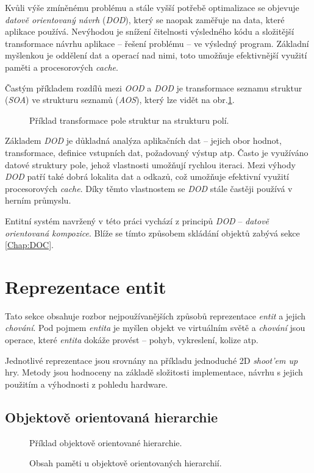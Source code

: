Kvůli výše zmíněnému problému a stále vyšší potřebě optimalizace se objevuje \emph{datově orientovaný návrh}\cite{DOD} (\emph{DOD}), který se naopak zaměřuje na data, které aplikace používá. Nevýhodou je snížení čitelnosti výsledného kódu a složitější transformace návrhu aplikace -- řešení problému -- ve výsledný program. Základní myšlenkou je oddělení dat a operací nad nimi, toto umožňuje efektivnější využití paměti a procesorových \emph{cache}. 

Častým příkladem rozdílů mezi \emph{OOD} a \emph{DOD} je transformace seznamu struktur (\emph{SOA}) ve strukturu seznamů (\emph{AOS}), který lze vidět na obr.\ref{Fig:SOAASO}.

\begin{figure}[]
	\caption{Příklad transformace pole struktur na strukturu polí. }
	\label{Fig:SOAASO}
\end{figure}

Základem \emph{DOD} je důkladná analýza aplikačních dat -- jejich obor hodnot, transformace, definice vstupních dat, požadovaný výstup atp. Často je využíváno datové struktury pole, jehož vlastnosti umožňují rychlou iteraci. Mezi výhody \emph{DOD} patří také dobrá lokalita dat a odkazů, což umožňuje efektivní využití procesorových \emph{cache}. Díky těmto vlastnostem se \emph{DOD} stále častěji používá v herním průmyslu\cite{DataOrientedDesignDice}\cite{DataOrientedDesignCppCon}.

Entitní systém navržený v této práci vychází z principů \emph{DOD} -- \emph{datově orientovaná kompozice}\cite{DODComponents}. Blíže se tímto způsobem skládání objektů zabývá sekce \ref{Chap:DOC}.

\section{Reprezentace entit}

Tato sekce obsahuje rozbor nejpoužívanějších způsobů reprezentace \emph{entit}\cite{EvolveHierarchy} a jejich \emph{chování}. Pod pojmem \emph{entita} je myšlen objekt ve virtuálním světě a \emph{chování} jsou operace, které \emph{entita} dokáže provést -- pohyb, vykreslení, kolize atp.

Jednotlivé reprezentace jsou srovnány na příkladu jednoduché 2D \emph{shoot'em up} hry. Metody jsou hodnoceny na základě složitosti implementace, návrhu s jejich použitím a výhodnosti z pohledu hardware. 

\subsection{Objektově orientovaná hierarchie}
\begin{figure}[H]
	\caption{Příklad objektově orientované hierarchie. }
\end{figure}
\begin{figure}[H]
	\caption{Obsah paměti u objektově orientovaných hierarchií. }
\end{figure}
\blind[3]

